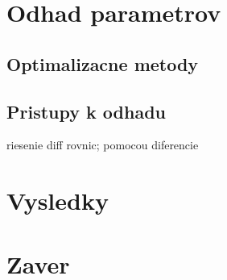 \documentclass[fleqn]{article}
\begin{document}
\section{Odhad parametrov}
\subsection{Optimalizacne metody}

\subsection{Pristupy k odhadu}
riesenie diff rovnic; pomocou diferencie

\section{Vysledky}

\section{Zaver}

\newpage


\end{document}
